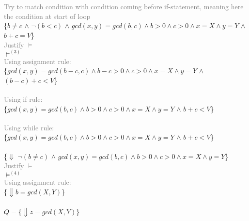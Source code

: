 \documentclass[11.5pt]{article}
\begin{document}
\begin{enumerate}
    \\
     \\
    \textcolor{gray}{Try to match condition with condition coming before if-statement, meaning here the condition at start of loop} \\
    \{\colorbox{magenta!10}{$b \neq c$} $\land$ \colorbox{NavyBlue!10}{$\lnot(b<c)$} $\land$ \colorbox{blue!10}{$gcd(x,y)=gcd(b,c) \land b > 0 \land c > 0 \land x=X \land y=Y$}
    $\land$ \colorbox{teal!10}{$b+c = V$}\} 
    \\  \textcolor{gray}{Justify $\vDash$} \\
    $\vDash^{(3)}$ \\
    \textcolor{gray}{Using assignment rule:} \\
    \{$gcd(x,y)=gcd(b-c,c) \land b-c > 0 \land c > 0 \land x=X \land y=Y$ $\land$ \colorbox{teal!10}{$(b-c)+c < V$}\} 
    \\
     \\
    \textcolor{gray}{Using if rule:} \\
    \{$gcd(x,y)=gcd(b,c) \land b >0 \land c > 0 \land x=X \land y=Y$ $\land$ \colorbox{teal!10}{$b+c < V$}\} 
    \\
     \\
    \textcolor{gray}{Using while rule:} \\
    \{$gcd(x,y)=gcd(b,c) \land b >0 \land c > 0 \land x=X \land y=Y$ $\land$ \colorbox{teal!10}{$b+c < V$}\} 
    \\
     \\
    \{$\Downarrow$ \colorbox{magenta!10}{$\lnot(b \neq c)$} $\land$ \colorbox{blue!10}{$gcd(x,y)=gcd(b,c) \land b >0 \land c > 0 \land x=X \land y=Y$}\} 
    \\  \textcolor{gray}{Justify $\vDash$} \\
    $\vDash^{(4)}$ \\
    \textcolor{gray}{Using assignment rule:}\\
    \{$\Downarrow b=gcd(X,Y)$\}
    \\
     \\
    $Q=$\{$\Downarrow z=gcd(X,Y)$\}


\end{enumerate}
\end{document}
